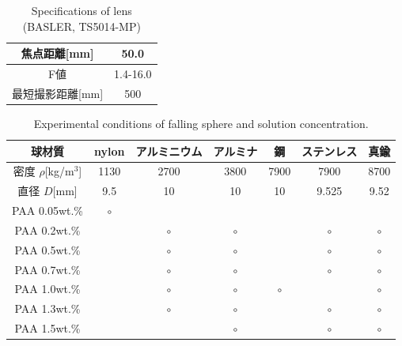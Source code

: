 \begin{table}[ht]
    \centering
    \caption{Specifications of lens (BASLER, TS5014-MP)}
    \label{table:lens}
    \begin{tabular}{c|c}\hline
        焦点距離[mm]     & 50.0     \\ \hline
        F値              & 1.4-16.0 \\ \hline
        最短撮影距離[mm] & 500      \\ \hline
    \end{tabular}
\end{table}

\begin{table}[h]
    \centering
    \caption{Experimental conditions of falling sphere and solution concentration.}
    \label{table:exp-conditions}
    \begin{tabular}{c|c|c|c|c|c|c}\hline
        球材質                & nylon   & アルミニウム & アルミナ & 鋼      & ステンレス & 真鍮    \\ \hline
        密度 $\rho$[kg/m$^3$] & 1130    & 2700         & 3800     & 7900    & 7900       & 8700    \\ \hline
        直径 $D$[mm]          & 9.5     & 10           & 10       & 10      & 9.525      & 9.52    \\ \hline \hline
        PAA 0.05wt.\%         & $\circ$ &              &          &         &            &         \\ \hline
        PAA 0.2wt.\%          &         & $\circ$      & $\circ$  &         & $\circ$    & $\circ$ \\ \hline
        PAA 0.5wt.\%          &         & $\circ$      & $\circ$  &         & $\circ$    & $\circ$ \\ \hline
        PAA 0.7wt.\%          &         & $\circ$      & $\circ$  &         & $\circ$    & $\circ$ \\ \hline
        PAA 1.0wt.\%          &         & $\circ$      & $\circ$  & $\circ$ &            & $\circ$ \\ \hline
        PAA 1.3wt.\%          &         & $\circ$      & $\circ$  &         & $\circ$    & $\circ$ \\ \hline
        PAA 1.5wt.\%          &         &              & $\circ$  &         & $\circ$    & $\circ$ \\ \hline
    \end{tabular}
\end{table}

